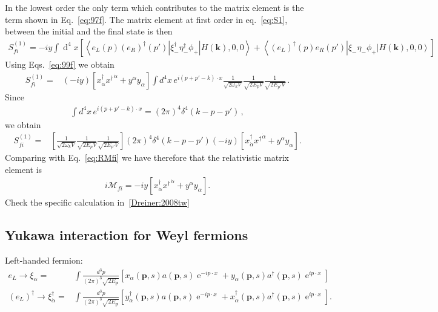 In the lowest order the only term which contributes to the matrix element is the term shown in Eq.~\eqref{eq:97f}.
The matrix element at first order in eq.~\eqref{eq:S1}, between the initial and the final state is then
\begin{align}
  S_{fi}^{(1)}=-i y \int \operatorname{d}^4x \left[ \left\langle e_L(p)\left( e_R \right)^{\dagger}(p') \left|\xi_-^{\dagger}\eta_-^{\dagger} \phi_{+}  \right|H(\mathbf{k}),0,0 \right\rangle
+\left\langle \left( e_L \right)^{\dagger}(p) e_R (p') \right|\xi_-\eta_- \phi_{+}  \left|H(\mathbf{k}),0,0 \right\rangle \right] 
\end{align}
Using Eqs.~\eqref{eq:99f}  we obtain
\begin{align}
  S_{fi}^{(1)}=&(-i y) \left[ x^{\dagger}_{\dot{\alpha}}{x^{\dagger}}^{\dot{\alpha}}+y^{\alpha}y_{\alpha} \right]
\int d^4x\,e^{i(p+p'-k)\cdot x}\frac{1}{\sqrt{2\omega_k V}}\frac{1}{\sqrt{2E_p V}}\frac{1}{\sqrt{2E_{p'} V}}\,.
\end{align}
Since
\begin{align}
  \int d^4x\,e^{i(p+p'-k)\cdot x}=(2\pi)^4\delta^4(k-p-p')\,,
\end{align}
we obtain
\begin{align}
  S_{fi}^{(1)}=&\left[\frac{1}{\sqrt{2\omega_k V}}\frac{1}{\sqrt{2E_p V}}\frac{1}{\sqrt{2E_{p'} V}}\right]
(2\pi)^4\delta^4(k-p-p')(-i y)\left[ x^{\dagger}_{\dot{\alpha}}{x^{\dagger}}^{\dot{\alpha}}+y^{\alpha}y_{\alpha} \right].
\end{align}
Comparing with Eq.~\eqref{eq:RMfi} we have therefore that the relativistic matrix element is
\begin{align}
  i\mathcal{M}_{fi}=-i y\left[ x^{\dagger}_{\dot{\alpha}}{x^{\dagger}}^{\dot{\alpha}}+y^{\alpha}y_{\alpha} \right].
\end{align}
Check the specific calculation in~\ref{Dreiner:2008tw}

\subsection{Yukawa interaction for Weyl fermions}
Left-handed fermion:
\begin{align}
e_L\to  \xi_{\alpha}=&\int \frac{d^3 p}{(2\pi)^3\sqrt{2E_{\mathbf{p}}}} \left[ x_{\alpha}(\mathbf{p},s)a(\mathbf{p},s)\operatorname{e}^{-i p\cdot x}+y_{\alpha}(\mathbf{p},s)a^{\dagger}(\mathbf{p},s)\operatorname{e}^{i p\cdot x} \right] \nonumber\\
\left( e_L \right)^{\dagger}\to  \xi_{\dot{\alpha}}^{\dagger}=&\int \frac{d^3 p}{(2\pi)^3\sqrt{2E_{\mathbf{p}}}} \left[y_{\dot{\alpha}}^{\dagger}(\mathbf{p},s)a(\mathbf{p},s)\operatorname{e}^{-i p\cdot x}+ x_{\dot{\alpha}}^{\dagger}(\mathbf{p},s)a^{\dagger}(\mathbf{p},s)\operatorname{e}^{i p\cdot x}\right] .
\end{align}

